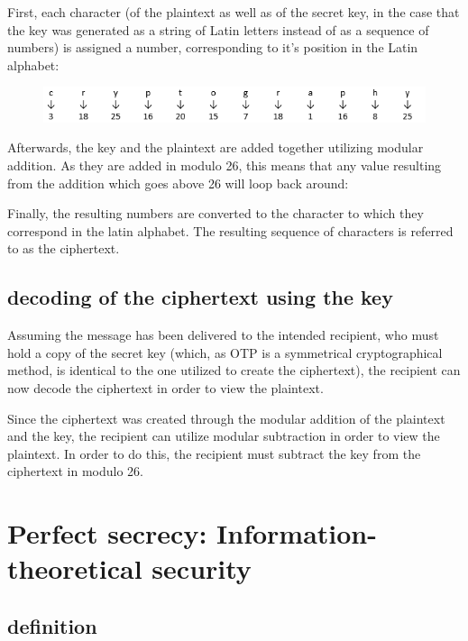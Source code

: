 \documentclass[12pt]{report}
\begin{document}
First, each character (of the plaintext as well as of the secret key, in the case that the key was generated as a string of Latin letters instead of as a sequence of numbers) is assigned a number, corresponding to it's position in the Latin alphabet:

\begin{figure}[H]
\centering
\includegraphics[scale=1]{table1.PNG}
\end{figure}

Afterwards, the key and the plaintext are added together utilizing modular addition. As they are added in modulo 26, this means that any value resulting from the addition which goes above 26 will loop back around:




Finally, the resulting numbers are converted to the character to which they correspond in the latin alphabet. The resulting sequence of characters is referred to as the ciphertext. 

\subsection{decoding of the ciphertext using the key}
Assuming the message has been delivered to the intended recipient, who must hold a copy of the secret key (which, as OTP is a symmetrical cryptographical method, is identical to the one utilized to create the ciphertext), the recipient can now decode the ciphertext in order to view the plaintext.

Since the ciphertext was created through the modular addition of the plaintext and the key, the recipient can utilize modular subtraction in order to view the plaintext. In order to do this, the recipient must subtract the key from the ciphertext in modulo 26.



\section{Perfect secrecy: Information-theoretical security}

\subsection{definition}

\end{document}

